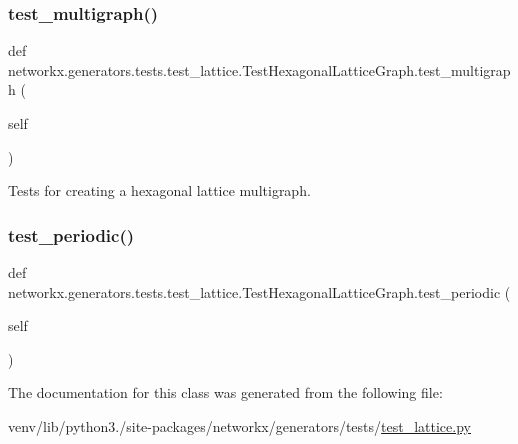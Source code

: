 \subsubsection{\texorpdfstring{test\+\_\+multigraph()}{test\_multigraph()}}
{\footnotesize\ttfamily def networkx.\+generators.\+tests.\+test\+\_\+lattice.\+Test\+Hexagonal\+Lattice\+Graph.\+test\+\_\+multigraph (\begin{DoxyParamCaption}\item[{}]{self }\end{DoxyParamCaption})}

\begin{DoxyVerb}Tests for creating a hexagonal lattice multigraph.\end{DoxyVerb}
 \mbox{\label{classnetworkx_1_1generators_1_1tests_1_1test__lattice_1_1TestHexagonalLatticeGraph_a2170ba8278c0732690c6feb80606a8af}} 
\subsubsection{\texorpdfstring{test\+\_\+periodic()}{test\_periodic()}}
{\footnotesize\ttfamily def networkx.\+generators.\+tests.\+test\+\_\+lattice.\+Test\+Hexagonal\+Lattice\+Graph.\+test\+\_\+periodic (\begin{DoxyParamCaption}\item[{}]{self }\end{DoxyParamCaption})}



The documentation for this class was generated from the following file\+:\begin{DoxyCompactItemize}
\item 
venv/lib/python3./site-\/packages/networkx/generators/tests/\hyperlink{test__lattice_8py}{test\+\_\+lattice.\+py}\end{DoxyCompactItemize}

